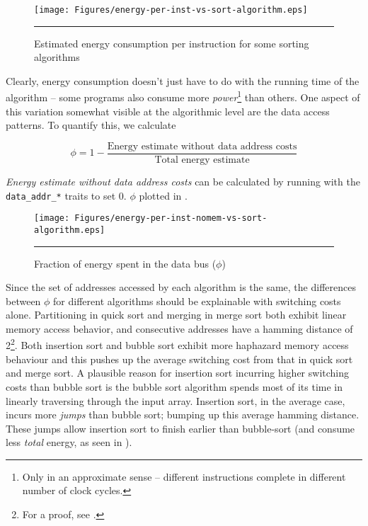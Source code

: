 \begin{figure}[htbp]
  \centering
  \texttt{[image: Figures/energy-per-inst-vs-sort-algorithm.eps]}
  \rule{35em}{0.5pt}
  \caption{Estimated energy consumption per instruction for some sorting algorithms}
  \label{fig:energy-per-inst-sort-algo}
\end{figure}

Clearly, energy consumption doesn't just have to do with the running
time of the algorithm -- some programs also consume more
\textit{power}\footnote{Only in an approximate sense -- different
  instructions complete in different number of clock cycles.} than
others.  One aspect of this variation somewhat visible at the
algorithmic level are the data access patterns.  To quantify this, we
calculate

\begin{equation}
\phi = 1 - \frac{\text{Energy estimate without data address
    costs}}{\text{Total energy estimate}}
\end{equation}

\textit{Energy estimate without data address costs} can be calculated
by running \wattage with the \texttt{data\_addr\_*} traits to set 0.
$\phi$ plotted in .

\begin{figure}[htbp]
  \centering
  \texttt{[image: Figures/energy-per-inst-nomem-vs-sort-algorithm.eps]}
  \rule{35em}{0.5pt}
  \caption{Fraction of energy spent in the data bus ($\phi$)}
  \label{fig:energy-per-inst-nomem-sort-algo}
\end{figure}

Since the set of addresses accessed by each algorithm is the same, the
differences between $\phi$ for different algorithms should be
explainable with switching costs alone.  Partitioning in quick sort
and merging in merge sort both exhibit linear memory access behavior,
and consecutive addresses have a hamming distance of 2\footnote{For a
  proof, see .}.  Both insertion sort
and bubble sort exhibit more haphazard memory access behaviour and
this pushes up the average switching cost from that in quick sort and
merge sort.  A plausible reason for insertion sort incurring higher
switching costs than bubble sort is the bubble sort algorithm spends
most of its time in linearly traversing through the input array.
Insertion sort, in the average case, incurs more \textit{jumps} than
bubble sort; bumping up this average hamming distance.  These jumps
allow insertion sort to finish earlier than bubble-sort (and consume
less \textit{total} energy, as seen in
).

